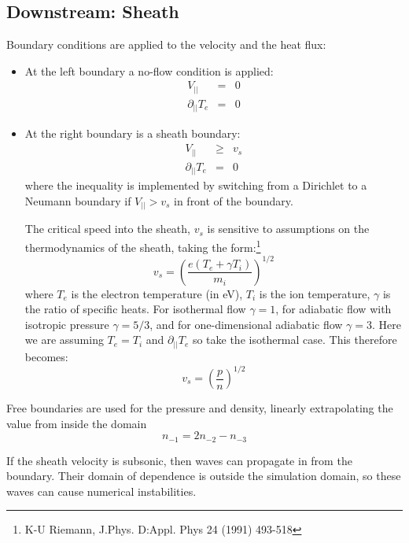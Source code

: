 \documentclass[12pt,a4paper]{article}
\begin{document}
\subsection{Downstream: Sheath}

Boundary conditions are applied to the velocity and the heat flux:
\begin{itemize}
\item  At the left boundary a no-flow condition is applied:
  \begin{eqnarray}
    V_{||} &=& 0 \nonumber \\
    \partial_{||}T_e &=& 0 \nonumber
  \end{eqnarray}
\item At the right boundary is a sheath boundary:
  \begin{eqnarray}
    V_{||} &\ge& v_s \nonumber \\
    \partial_{||}T_e &=& 0 \nonumber
  \end{eqnarray}
  where the inequality is implemented by switching from a Dirichlet to a Neumann boundary if $V_{||} > v_s$ in front of the boundary.
  
  The critical speed into the sheath, $v_s$ is sensitive to assumptions on the thermodynamics of the sheath, 
  taking the form:\footnote{K-U Riemann, J.Phys. D:Appl. Phys 24 (1991) 493-518}
  \begin{equation}
  v_s = \left( \frac{e\left(T_e + \gamma T_i\right)}{m_i}\right)^{1/2}
  \end{equation}
  where $T_e$  is the electron temperature (in eV), $T_i$ is the ion temperature, $\gamma$ is the ratio of specific heats. For isothermal flow $\gamma=1$, for adiabatic flow with isotropic pressure $\gamma=5/3$, and for one-dimensional adiabatic flow $\gamma=3$. Here we are assuming $T_e = T_i$ and $\partial_{||}T_e$ so take the isothermal case. This therefore becomes:
  \begin{equation}
    v_s = \left( \frac{p}{n}\right)^{1/2}
    \label{eq:sheath_speed}
  \end{equation}
\end{itemize}

Free boundaries are used for the pressure and density, linearly extrapolating the value from
inside the domain
\begin{equation}
  n_{-1} = 2n_{-2} - n_{-3}
\end{equation}

If the sheath velocity is subsonic, then waves can propagate in from the boundary. Their domain
of dependence is outside the simulation domain, so these waves can cause numerical instabilities.
\end{document}

